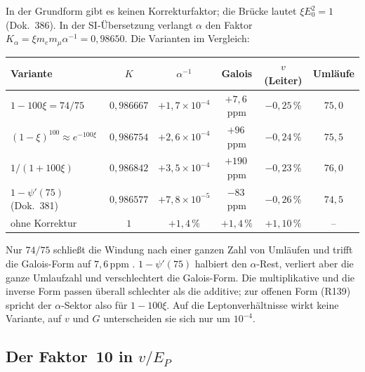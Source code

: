 In der Grundform gibt es keinen Korrekturfaktor; die Brücke lautet $\xi E_0^2=1$ (Dok.~386). In
der SI-Übersetzung verlangt $\alpha$ den Faktor $K_\alpha=\xi m_em_\mu\alpha^{-1}=0{,}98650$. Die
Varianten im Vergleich:
\begin{center}
\small
\begin{tabular}{@{}lccccc@{}}
\toprule
\textbf{Variante} & $K$ & $\alpha^{-1}$ & \textbf{Galois} & $v$ (Leiter) & \textbf{Umläufe} \\
\midrule
$1-100\xi=74/75$ & $0{,}986667$ & $+1{,}7\times10^{-4}$ & $+7{,}6$\,ppm & $-0{,}25\,\%$ & $75{,}0$ \\
$(1-\xi)^{100}\approx e^{-100\xi}$ & $0{,}986754$ & $+2{,}6\times10^{-4}$ & $+96$\,ppm & $-0{,}24\,\%$ & $75{,}5$ \\
$1/(1+100\xi)$ & $0{,}986842$ & $+3{,}5\times10^{-4}$ & $+190$\,ppm & $-0{,}23\,\%$ & $76{,}0$ \\
$1-\psi'(75)$ (Dok.~381) & $0{,}986577$ & $+7{,}8\times10^{-5}$ & $-83$\,ppm & $-0{,}26\,\%$ & $74{,}5$ \\
ohne Korrektur & $1$ & $+1{,}4\,\%$ & $+1{,}4\,\%$ & $+1{,}10\,\%$ & -- \\
\bottomrule
\end{tabular}
\end{center}
Nur $74/75$ schließt die Windung nach einer ganzen Zahl von Umläufen und trifft die Galois-Form
auf $7{,}6$\,ppm \KM. $1-\psi'(75)$ halbiert den $\alpha$-Rest, verliert aber die ganze Umlaufzahl
und verschlechtert die Galois-Form. Die multiplikative und die inverse Form passen überall
schlechter als die additive; zur offenen Form (R139) spricht der $\alpha$-Sektor also für
$1-100\xi$. Auf die Leptonverhältnisse wirkt keine Variante, auf $v$ und $G$ unterscheiden sie
sich nur um $10^{-4}$.

\subsection{Der Faktor~10 in \texorpdfstring{$v/E_P$}{v/E\_P}}

